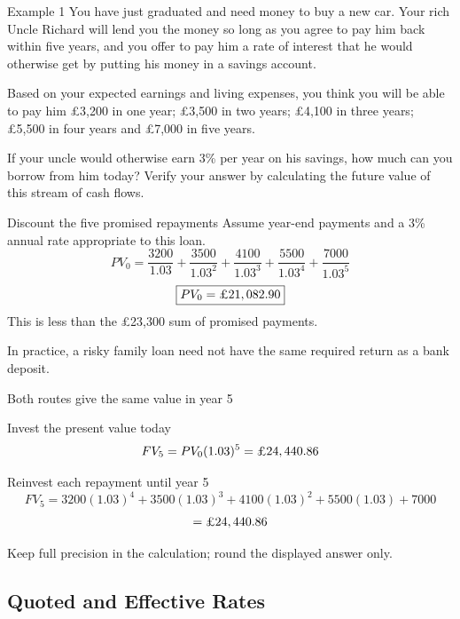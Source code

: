 \documentclass[9pt,aspectratio=169]{beamer}
\begin{document}
\begin{frame}{Example 1}
You have just graduated and need money to buy a new car. Your rich Uncle Richard will lend you the money so long as you agree to pay him back within five years, and you offer to pay him a rate of interest that he would otherwise get by putting his money in a savings account.

Based on your expected earnings and living expenses, you think you will be able to pay him £3,200 in one year; £3,500 in two years; £4,100 in three years; £5,500 in four years and £7,000 in five years.

If your uncle would otherwise earn 3\% per year on his savings, how much can you borrow from him today? Verify your answer by calculating the future value of this stream of cash flows.
\end{frame}

\begin{frame}{Discount the five promised repayments}
Assume year-end payments and a 3\% annual rate appropriate to this loan.
\[
PV_0=\frac{3200}{1.03}+\frac{3500}{1.03^2}+\frac{4100}{1.03^3}
       +\frac{5500}{1.03^4}+\frac{7000}{1.03^5}
\]
\[
\boxed{PV_0=\text{£}21,082.90}
\]
This is less than the £23,300 sum of promised payments.

\smallskip
In practice, a risky family loan need not have the same required return as a bank deposit.
\end{frame}

\begin{frame}{Both routes give the same value in year 5}
\begin{block}{Invest the present value today}
\[FV_5=PV_0(1.03)^5=\text{£}24,440.86\]
\end{block}
\begin{block}{Reinvest each repayment until year 5}
\[FV_5=3200(1.03)^4+3500(1.03)^3+4100(1.03)^2+5500(1.03)+7000\]
\[=\text{£}24,440.86\]
\end{block}
Keep full precision in the calculation; round the displayed answer only.
\end{frame}

\subsection{Quoted and Effective Rates}
\end{document}
